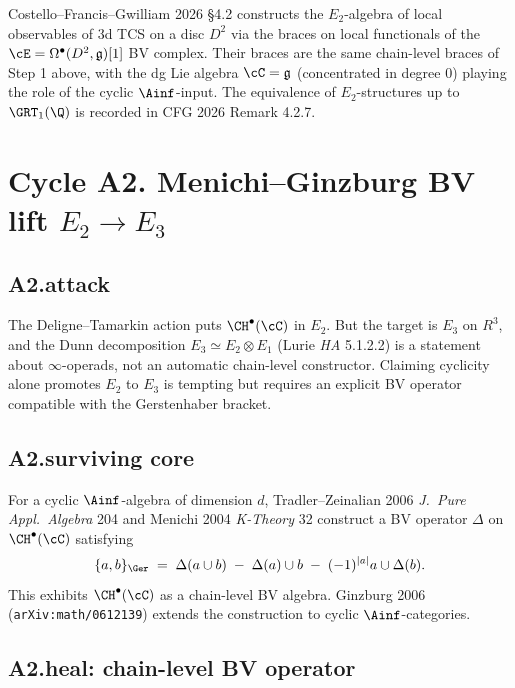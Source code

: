 \begin{remark}
\label{wave-cfg-rem:a1-cfg}
Costello--Francis--Gwilliam 2026 \S 4.2 constructs the $E_2$-algebra of
local observables of $3$d TCS on a disc $D^2$ via the braces on local
functionals of the $\cE=\Omega^\bullet(D^2,\mathfrak g)[1]$ BV complex.
Their braces are the same chain-level braces of Step 1 above, with the
dg Lie algebra $\cC=\mathfrak g$ (concentrated in degree $0$) playing
the role of the cyclic $\Ainf$-input. The equivalence of $E_2$-structures
up to $\GRT_1(\Q)$ is recorded in CFG 2026 Remark 4.2.7.
\end{remark}

\section*{Cycle A2. Menichi--Ginzburg BV lift $E_2\to E_3$}

\subsection*{A2.attack}

The Deligne--Tamarkin action puts $\CH^\bullet(\cC)$ in $E_2$. But the
target is $E_3$ on $R^3$, and the Dunn decomposition $E_3\simeq
E_2\otimes E_1$ (Lurie \emph{HA} 5.1.2.2) is a statement about
$\infty$-operads, not an automatic chain-level constructor. Claiming
cyclicity alone promotes $E_2$ to $E_3$ is tempting but requires an
explicit BV operator compatible with the Gerstenhaber bracket.

\subsection*{A2.surviving core}

For a cyclic $\Ainf$-algebra of dimension $d$, Tradler--Zeinalian 2006
\emph{J.\ Pure Appl.\ Algebra} 204 and Menichi 2004
\emph{K-Theory} 32 construct a BV operator $\Delta$ on
$\CH^\bullet(\cC)$ satisfying
\[
\{a,b\}_\Ger\;=\;\Delta(a\cup b)\;-\;\Delta(a)\cup b\;-\;(-1)^{|a|}a\cup\Delta(b).
\]
This exhibits $\CH^\bullet(\cC)$ as a chain-level BV algebra. Ginzburg
2006 (\texttt{arXiv:math/0612139}) extends the construction to cyclic
$\Ainf$-categories.

\subsection*{A2.heal: chain-level BV operator}

